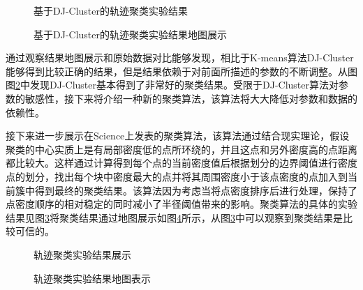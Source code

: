 \begin{figure}[htb]
  \centering%
  \hspace{4em}%
  \caption{基于DJ-Cluster的轨迹聚类实验结果}
  \label{fig:3_10_2}
\end{figure}
\begin{figure}[htb]
  \centering%
  \hspace{4em}%
  \caption{基于DJ-Cluster的轨迹聚类实验结果地图展示}
  \label{fig:3_11_2}
\end{figure}
\par 通过观察结果地图展示和原始数据对比能够发现，相比于K-means算法DJ-Cluster能够得到比较正确的结果，但是结果依赖于对前面所描述的参数的不断调整。从图图\ref{fig:3_11_2}中发现DJ-Cluster基本得到了非常好的聚类结果。受限于DJ-Cluster算法对参数的敏感性，接下来将介绍一种新的聚类算法，该算法将大大降低对参数和数据的依赖性。
\par 接下来进一步展示在Science上发表的聚类算法，该算法通过结合现实理论，假设聚类的中心实质上是有局部密度低的点所环绕的，并且这点和另外密度高的点距离都比较大。这样通过计算得到每个点的当前密度值后根据划分的边界阈值进行密度点的划分，找出每个块中密度最大的点并将其周围密度小于该点密度的点加入到当前簇中得到最终的聚类结果。该算法因为考虑当将点密度排序后进行处理，保持了点密度顺序的相对稳定的同时减小了半径阈值带来的影响。聚类算法的具体的实验结果见图\ref{fig:3_12_1}将聚类结果通过地图展示如图\ref{fig:3_13_1}所示，从图\ref{fig:3_12_1}中可以观察到聚类结果是比较可信的。
\begin{figure}[htb]
  \centering%
  \hspace{4em}%
  \caption{轨迹聚类实验结果展示}
  \label{fig:3_12_1}
\end{figure}
\begin{figure}[htb]
  \centering%
  \hspace{4em}%
  \caption{轨迹聚类实验结果地图表示}
  \label{fig:3_13_1}
\end{figure}

